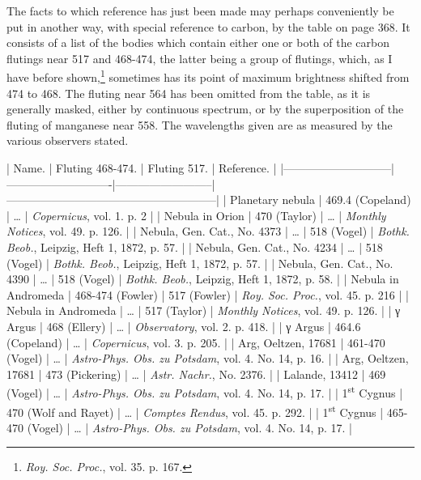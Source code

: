 \documentclass[a4paper, 12pt, oneside, polutonikogreek, english]{article}
\begin{document}
The facts to which reference has just been made may perhaps conveniently be put in another way, with special reference to carbon, by the table on page 368. It consists of a list of the bodies which contain either one or both of the carbon flutings near 517 and 468-474, the latter being a group of flutings, which, as I have before shown,\footnote{\emph{Roy. Soc. Proc.}, vol. 35. p. 167.} sometimes has its point of maximum brightness shifted from 474 to 468. The fluting near 564 has been omitted from the table, as it is generally masked, either by continuous spectrum, or by the superposition of the fluting of manganese near 558. The wavelengths given are as measured by the various observers stated.

| Name.            | Fluting 468-474.      | Fluting 517.       | Reference.                       |
|-----------------------------|----------------------------|--------------------------|--------------------------------------------------------|
| Planetary nebula      | 469.4 (Copeland)      | …            | \emph{Copernicus}, vol. 1. p. 2               |
| Nebula in Orion       | 470 (Taylor)        | …            | \emph{Monthly Notices}, vol. 49. p. 126.          |
| Nebula, Gen. Cat., No. 4373 | …             | 518 (Vogel)       | \emph{Bothk. Beob.}, Leipzig, Heft 1, 1872, p. 57.     |
| Nebula, Gen. Cat., No. 4234 | …             | 518 (Vogel)       | \emph{Bothk. Beob.}, Leipzig, Heft 1, 1872, p. 57.     |
| Nebula, Gen. Cat., No. 4390 | …             | 518 (Vogel)       | \emph{Bothk. Beob.}, Leipzig, Heft 1, 1872, p. 58.     |
| Nebula in Andromeda     | 468-474 (Fowler)      | 517 (Fowler)       | \emph{Roy. Soc. Proc.}, vol. 45. p. 216           |
| Nebula in Andromeda     | …             | 517 (Taylor)       | \emph{Monthly Notices}, vol. 49. p. 126.          |
| γ Argus           | 468 (Ellery)        | …            | \emph{Observatory}, vol. 2. p. 418.             |
| γ Argus           | 464.6 (Copeland)      | …            | \emph{Copernicus}, vol. 3. p. 205.             |
| Arg, Oeltzen, 17681     | 461-470 (Vogel)      | …            | \emph{Astro-Phys. Obs. zu Potsdam}, vol. 4. No. 14, p. 16. |
| Arg, Oeltzen, 17681     | 473 (Pickering)      | …            | \emph{Astr. Nachr.}, No. 2376.               |
| Lalande, 13412       | 469 (Vogel)        | …            | \emph{Astro-Phys. Obs. zu Potsdam}, vol. 4. No. 14, p. 17. |
| 1\textsuperscript{st} Cygnus         | 470 (Wolf and Rayet)    | …            | \emph{Comptes Rendus}, vol. 45. p. 292.           |
| 1\textsuperscript{st} Cygnus         | 465-470 (Vogel)      | …            | \emph{Astro-Phys. Obs. zu Potsdam}, vol. 4. No. 14, p. 17. |
\end{document}
